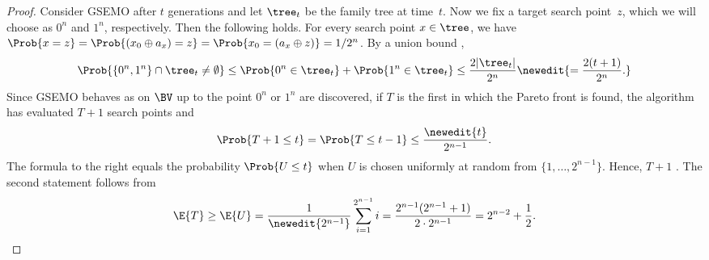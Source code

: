 \begin{proof}
    Consider GSEMO after $t$ generations and let $\tree_t$ be the family tree at time~$t$. 
    Now we fix a target search point~$z$, which we will choose as $0^n$ and $1^n$, respectively. Then the following holds.
    For every search point $x \in \tree$, we have $\Prob{x = z} = \Prob{(x_0 \oplus a_x) = z} = \Prob{x_0 = (a_x \oplus z)} = 1/2^{n}$. 
    By a union bound ,
    \[
        \Prob{\{0^n, 1^n\} \cap \tree_t \neq \emptyset} \le \Prob{0^n \in \tree_t} + \Prob{1^n \in \tree_t} \le \frac{2|\tree_t|}{2^n} 
        \newedit{=\frac{2(t+1)}{2^n}.}
    \]
    Since GSEMO behaves as on $\BV$ up to the point $0^n$ or $1^n$ are discovered, if $T$ is 
    the first 
    in which the Pareto front is found, the algorithm has evaluated $T+1$ search points and
    \[
        \Prob{T+1 \le t} = \Prob{T \le t-1} \le \frac{\newedit{t}}{2^{n-1}}.
    \]
    The formula to the right equals the probability $\Prob{U \le t}$ when $U$ is chosen uniformly at random from $\{1, \dots, 2^{n-1}\}$. Hence, $T+1$ 
    . 
    The second statement follows from 
    \[
        \E{T}\geq \E{U}= \frac{1}{\newedit{2^{n-1}}} \sum_{i=1}^{2^{n-1}} i = \frac{2^{n-1}(2^{n-1}+1)}{2 \cdot 2^{n-1}}
        =
        2^{n-2}+\frac{1}{2}.
    \]
\end{proof}

\subsection{}\label{sec:nsga-smsemoa-ozbinval}

